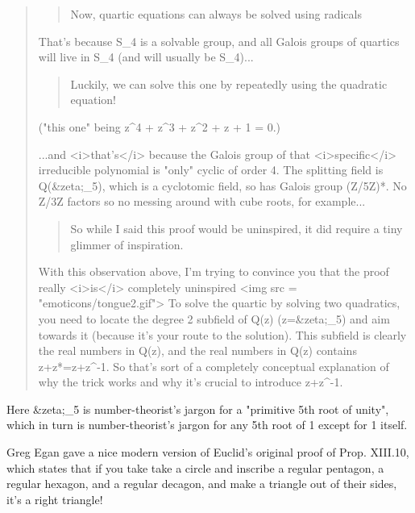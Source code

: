 \begin{quote}

\begin{quote}
    Now, quartic equations can always be solved using radicals
\end{quote}

That's because S_{4} is a solvable group, and all Galois
groups of quartics will live in S_{4} (and will usually be
S_{4})...

\begin{quote}
    Luckily, we can solve this one by repeatedly using the quadratic equation!
\end{quote}

("this one" being z^{4} + z^{3} + z^{2} + z + 1 = 0.)

...and <i>that's</i> because the Galois group of that <i>specific</i>
irreducible polynomial is "only" cyclic of order 4. The splitting
field is Q(&zeta;_{5}), which is a cyclotomic field, so has
Galois group (Z/5Z)*. No Z/3Z factors so no messing around
with cube roots, for example...

\begin{quote}
    So while I said this
    proof would be uninspired, it did require a tiny glimmer of inspiration.
\end{quote}

With this observation above, I'm trying to convince you that the proof
really <i>is</i> completely uninspired <img src =
"emoticons/tongue2.gif"> To solve the quartic by solving two
quadratics, you need to locate the degree 2 subfield of Q(z)
(z=&zeta;_{5}) and aim towards it (because it's your route to
the solution). This subfield is clearly the real numbers in Q(z), and
the real numbers in Q(z) contains z+z*=z+z^{-1}. So that's sort
of a completely conceptual explanation of why the trick works and why
it's crucial to introduce z+z^{-1}.

\end{quote}

Here &zeta;_{5} is number-theorist's jargon for a "primitive
5th root of unity", which in turn is number-theorist's jargon for any 
5th root of 1 except for 1 itself.

Greg Egan gave a nice modern version of Euclid's original 
proof of Prop. XIII.10, which states that if you take
take a circle and inscribe a regular pentagon, a regular hexagon, and 
a regular decagon, and make a triangle out of their sides, it's
a right triangle!

